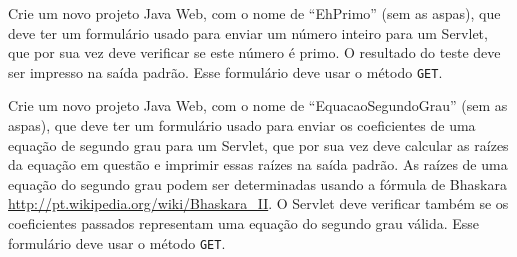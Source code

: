 \begin{projetoSemArquivo}{}{}{}
    Crie um novo projeto Java Web, com o nome de ``EhPrimo'' (sem as aspas), que deve ter um formulário usado para enviar um número inteiro para um Servlet, que por sua vez deve verificar se este número é primo. O resultado do teste deve ser impresso na saída padrão. Esse formulário deve usar o método \texttt{GET}.
\end{projetoSemArquivo}

\begin{projetoSemArquivo}{}{}{}
    Crie um novo projeto Java Web, com o nome de ``EquacaoSegundoGrau'' (sem as aspas), que deve ter um formulário usado para enviar os coeficientes de uma equação de segundo grau para um Servlet, que por sua vez deve calcular as raízes da equação em questão e imprimir essas raízes na saída padrão. As raízes de uma equação do segundo grau podem ser determinadas usando a fórmula de Bhaskara \url{http://pt.wikipedia.org/wiki/Bhaskara_II}. O Servlet deve verificar também se os coeficientes passados representam uma equação do segundo grau válida. Esse formulário deve usar o método \texttt{GET}.
\end{projetoSemArquivo}